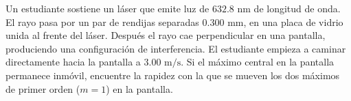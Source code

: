 \item Un estudiante sostiene un láser que emite luz de $632.8\text{ nm}$ de longitud de onda. El rayo pasa por un par de rendijas separadas $0.300\text{ mm}$, en una placa de vidrio unida al frente del láser. Después el rayo cae perpendicular en una pantalla, produciendo una configuración de interferencia. El estudiante empieza a caminar directamente hacia la pantalla a $3.00\text{ m/s}$. Si el máximo central en la pantalla permanece inmóvil, encuentre la rapidez con la que se mueven los dos máximos de primer orden ($m = 1$) en la pantalla.